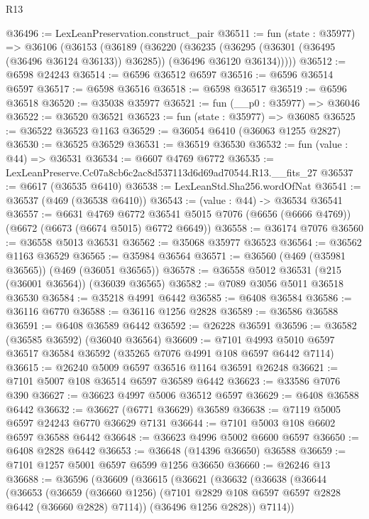 \begin{lexlean}{R13}
\begin{coremodule}
@36496 := LexLeanPreservation.construct_pair
@36511 := fun (state : @35977) =>
  @36106
    (@36153
      (@36189
        (@36220
          (@36235
            (@36295 (@36301 (@36495 (@36496 @36124 @36133)) @36285))
            (@36496 @36120 @36134)))))
@36512 := @6598 @24243
@36514 := @6596 @36512 @6597
@36516 := @6596 @36514 @6597
@36517 := @6598 @36516
@36518 := @6598 @36517
@36519 := @6596 @36518
@36520 := @35038 @35977
@36521 := fun (__p0 : @35977) => @36046
@36522 := @36520 @36521
@36523 := fun (state : @35977) => @36085
@36525 := @36522 @36523 @1163
@36529 := @36054 @6410 (@36063 @1255 @2827)
@36530 := @36525 @36529
@36531 := @36519 @36530
@36532 := fun (value : @44) => @36531
@36534 := @6607 @4769 @6772
@36535 := LexLeanPreserve.Cc07a8cb6c2ac8d537113d6d69ad70544.R13.__fits_27
@36537 := @6617 (@36535 @6410)
@36538 := LexLeanStd.Sha256.wordOfNat
@36541 := @36537 (@469 (@36538 @6410))
@36543 := (value : @44) -> @36534 @36541
@36557 := @6631
    @4769
    @6772
    @36541
    @5015
    @7076
    (@6656 (@6666 @4769))
    (@6672 (@6673 (@6674 @5015) @6772 @6649))
@36558 := @36174 @7076
@36560 := @36558 @5013 @36531
@36562 := @35068 @35977 @36523
@36564 := @36562 @1163 @36529
@36565 := @35984 @36564
@36571 := @36560 (@469 (@35981 @36565)) (@469 (@36051 @36565))
@36578 := @36558 @5012 @36531 (@215 (@36001 @36564)) (@36039 @36565)
@36582 := @7089 @3056 @5011 @36518 @36530
@36584 := @35218 @4991 @6442
@36585 := @6408 @36584
@36586 := @36116 @6770
@36588 := @36116 @1256 @2828
@36589 := @36586 @36588
@36591 := @6408 @36589 @6442
@36592 := @26228 @36591
@36596 := @36582 (@36585 @36592) (@36040 @36564)
@36609 := @7101 @4993 @5010 @6597 @36517 @36584 @36592 (@35265 @7076 @4991 @108 @6597 @6442 @7114)
@36615 := @26240 @5009 @6597 @36516 @1164 @36591 @26248
@36621 := @7101 @5007 @108 @36514 @6597 @36589 @6442
@36623 := @33586 @7076 @390
@36627 := @36623 @4997 @5006 @36512 @6597
@36629 := @6408 @36588 @6442
@36632 := @36627 (@6771 @36629) @36589
@36638 := @7119 @5005 @6597 @24243 @6770 @36629 @7131
@36644 := @7101 @5003 @108 @6602 @6597 @36588 @6442
@36648 := @36623 @4996 @5002 @6600 @6597
@36650 := @6408 @2828 @6442
@36653 := @36648 (@14396 @36650) @36588
@36659 := @7101 @1257 @5001 @6597 @6599 @1256 @36650
@36660 := @26246 @13
@36688 := @36596
    (@36609
      (@36615
        (@36621
          (@36632
            (@36638
              (@36644
                (@36653
                  (@36659
                    (@36660 @1256)
                    (@7101 @2829 @108 @6597 @6597 @2828 @6442 (@36660 @2828) @7114))
                  (@36496 @1256 @2828))
                @7114))

\end{coremodule}
\end{lexlean}
